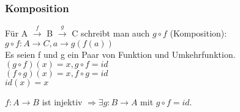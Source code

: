 \subsubsection{Komposition}
\begin{defi}[Komposition]
Für A $\xrightarrow{f}$ B $\xrightarrow{g}$ C schreibt man auch $g \circ f$ (Komposition): $g\circ f: A\rightarrow C,a\rightarrow g(f(a))$\\
Es seien f und g ein Paar von Funktion und Umkehrfunktion.\\
$(g\circ f)(x)=x, g\circ f=id$\\
$(f\circ g)(x)=x, f\circ g=id$\\
$id(x)=x$\\
\end{defi}

\begin{satz}
$f:A\rightarrow B$ ist injektiv $\Rightarrow \exists g:B\rightarrow A$ mit $g\circ f=id$. 
\end{satz}

